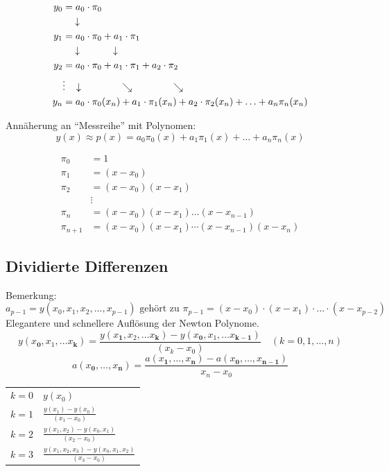 \begin{minipage}[t]{7.5cm}
	\begin{align}
		y_0 &= a_0\cdot \pi_0 \nonumber\\
		&\quad \downarrow\nonumber\\
		y_1 &= a_0\cdot \pi_0 +a_1\cdot\pi_1 \nonumber\\
		&\quad \downarrow \hspace{1.2cm}\downarrow\nonumber\\
		y_2 &= a_0\cdot \pi_0 +a_1\cdot\pi_1  +a_2\cdot\pi_2  \nonumber\\
		&\vdots\hspace{0.3cm}\downarrow \hspace{1.5cm}\searrow\hspace{1.5cm}\searrow\nonumber\\
		y_n &= a_0\cdot \pi_0(x_n) +a_1\cdot\pi_1(x_n)  +a_2\cdot\pi_2(x_n)+\ldots+ a_n\pi_n(x_n) \nonumber
	\end{align}

	Annäherung an ``Messreihe'' mit Polynomen: $$y(x)\approx p(x) = a_0 \pi_0(x) + a_1 \pi_1(x) + \ldots+ a_{n} \pi_{n}(x)$$
\end{minipage}
\hfill
\begin{minipage}[t]{11.5cm}
	\begin{align}
		\pi_0 &= 1 \nonumber\\
		\pi_1 &= (x-x_0) \nonumber\\
		\pi_2 &= (x-x_0)(x-x_1) \nonumber\\
		&\vdots \nonumber\\
		\pi_n &= (x-x_0)(x-x_1)\ldots(x-x_{n-1}) \nonumber\\
		\pi_{n+1} &= (x-x_0)(x-x_1)\cdots(x-x_{n-1})(x-x_n) \nonumber
	\end{align}	
\end{minipage}

\subsection{Dividierte Differenzen}
Bemerkung:
\[
	a_{p-1} = y(x_0,x_1,x_2, ... , x_{p-1}) \text{ gehört zu } \pi_{p-1}=(x-x_0)\cdot(x-x_1)\cdot ... \cdot (x-x_{p-2})
\]
Elegantere und schnellere Auflösung der Newton Polynome.
$$y(x_\mathbf{0}, x_1, \ldots x_\mathbf{k}) = \frac{y(x_\mathbf{1},x_2,\ldots x_\mathbf{k})-y(x_\mathbf{0},x_1,\ldots x_{\mathbf{k-1}})}{(x_k-x_0)} \quad (k=0,1,\ldots,n)$$
$$a(x_\mathbf{0},\ldots,x_\mathbf{n})=\frac{a(x_\mathbf{1},\ldots,x_\mathbf{n})-a(x_\mathbf{0},\ldots,x_{\mathbf{n-1}})}{x_n-x_0}$$
\begin{tabular}{ll}
$k=0$ &$y(x_0)$ \\[0.2cm]
$k=1$ &$\frac{y(x_1)-y(x_0)}{(x_1-x_0)}$\\[0.2cm]
$k=2$ &$\frac{y(x_1,x_2)-y(x_0,x_1)}{(x_2-x_0)}$\\[0.2cm]
$k=3$ &$\frac{y(x_1,x_2,x_3)-y(x_0,x_1,x_2)}{(x_3-x_0)}$\\
\end{tabular}\\
\\

